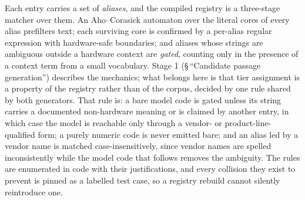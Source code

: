 Each entry carries a set of \emph{aliases}, and the compiled registry is a
three-stage matcher over them. An Aho--Corasick automaton over the literal cores of
every alias prefilters text; each surviving core is confirmed by a per-alias regular
expression with hardware-safe boundaries; and aliases whose strings are ambiguous
outside a hardware context are \emph{gated}, counting only in the presence of a
context term from a small vocabulary. Stage 1 (\S\,``Candidate passage generation'')
describes the mechanics; what belongs here is that tier assignment is a property of
the registry rather than of the corpus, decided by one rule shared by both
generators. That rule is: a bare model code is gated unless its string carries a
documented non-hardware meaning or is claimed by another entry, in which case the
model is reachable only through a vendor- or product-line-qualified form; a
purely numeric code is never emitted bare; and an alias led by a vendor name is
matched case-insensitively, since vendor names are spelled inconsistently while the
model code that follows removes the ambiguity. The rules are enumerated in code
with their justifications, and every collision they exist to prevent is pinned as a
labelled test case, so a registry rebuild cannot silently reintroduce one.

